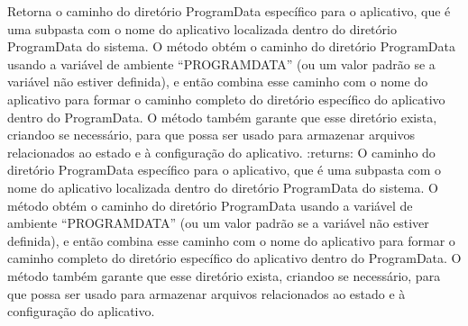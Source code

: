 \documentclass[letterpaper,10pt,english]{sphinxmanual}
\begin{document}
\begin{fulllineitems}
\label{\detokenize{api/simple_lock:simple_lock.programdata_dir}}
\pysigstartsignatures
\pysiglinewithargsret
{}
{}
{}
\pysigstopsignatures
\sphinxAtStartPar
Retorna o caminho do diretório ProgramData específico para o aplicativo, que é uma subpasta com o nome do aplicativo localizada dentro do diretório ProgramData do sistema. O método obtém o caminho do diretório ProgramData usando a variável de ambiente “PROGRAMDATA” (ou um valor padrão se a variável não estiver definida), e então combina esse caminho com o nome do aplicativo para formar o caminho completo do diretório específico do aplicativo dentro do ProgramData. O método também garante que esse diretório exista, criando\sphinxhyphen{}o se necessário, para que possa ser usado para armazenar arquivos relacionados ao estado e à configuração do aplicativo.
:returns: O caminho do diretório ProgramData específico para o aplicativo, que é uma subpasta com o nome do aplicativo localizada dentro do diretório ProgramData do sistema. O método obtém o caminho do diretório ProgramData usando a variável de ambiente “PROGRAMDATA” (ou um valor padrão se a variável não estiver definida), e então combina esse caminho com o nome do aplicativo para formar o caminho completo do diretório específico do aplicativo dentro do ProgramData. O método também garante que esse diretório exista, criando\sphinxhyphen{}o se necessário, para que possa ser usado para armazenar arquivos relacionados ao estado e à configuração do aplicativo.
\begin{quote}\begin{description}
\sphinxAtStartPar
{}

\end{description}\end{quote}

\end{fulllineitems}

\end{document}
